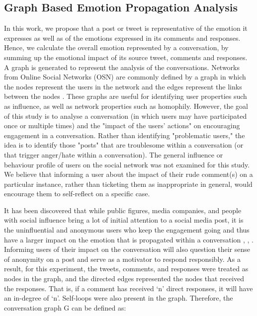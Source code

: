 \documentclass[acmtog]{acmart}
\begin{document}
\subsection{Graph Based Emotion Propagation Analysis}
In this work, we propose that a post or tweet is representative of the emotion it expresses as well as of the emotions expressed in its comments and responses. Hence, we calculate the overall emotion represented by a conversation, by summing up the emotional impact of its source tweet, comments and responses. A graph is generated to represent the analysis of the conversations. Networks from Online Social Networks (OSN) are commonly defined by a graph in which the nodes represent the users in the network and the edges represent the links between the nodes \cite{antonakaki2021survey}. These graphs are useful for identifying user properties such as influence, as well as network properties such as homophily. However, the goal of this study is to analyse a conversation (in which users may have participated once or multiple times) and the "impact of the users' actions" on encouraging engagement in a conversation. Rather than identifying "problematic users," the idea is to identify those "posts" that are troublesome within a conversation (or that trigger anger/hate within a conversation). The general influence or behaviour profile of users on the social network was not examined for this study. We believe that informing a user about the impact of their rude comment(s) on a particular instance, rather than ticketing them as inappropriate in general, would encourage them to self-reflect on a specific case. 


It has been discovered that while public figures, media companies, and people with social influence bring a lot of initial attention to a social media post, it is the uninfluential and anonymous users who keep the engagement going and thus have a larger impact on the emotion that is propagated within a conversation \cite{solovev2022moral}, \cite{mirbabaie2021development}, \cite{saveski2021structure}. Informing users of their impact on the conversation will also question their sense of anonymity on a post and serve as a motivator to respond responsibly. As a result, for this experiment, the tweets, comments, and responses were treated as nodes in the graph, and the directed edges represented the nodes that received the responses. That is, if a comment has received `n' direct responses, it will have an in-degree of `n'. Self-loops were also present in the graph. Therefore, the conversation graph G can be defined as:
\end{document}
